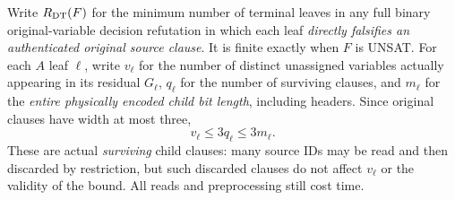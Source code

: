 \documentclass[11pt]{article}
\begin{document}
Write $R_{\rm DT}(F)$ for the minimum number of terminal leaves in any full binary original-variable decision refutation in which each leaf \emph{directly falsifies an authenticated original source clause}. It is finite exactly when $F$ is UNSAT. For each $A$ leaf $\ell$, write $v_\ell$ for the number of distinct unassigned variables actually appearing in its residual $G_\ell$, $q_\ell$ for the number of surviving clauses, and $m_\ell$ for the \emph{entire physically encoded child bit length}, including headers. Since original clauses have width at most three,
\[
                  v_\ell\le 3q_\ell\le 3m_\ell.
\tag{1}
\]
These are actual \emph{surviving} child clauses: many source IDs may be read and then discarded by restriction, but such discarded clauses do not affect $v_\ell$ or the validity of the bound. All reads and preprocessing still cost time.
\end{document}
